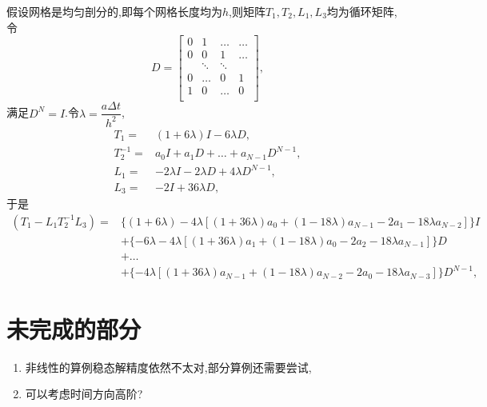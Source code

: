 \documentclass[a4paper, 11pt]{ctexart}
\numberwithin{equation}{section}
\numberwithin{figure}{section}
\begin{document}
假设网格是均匀剖分的,即每个网格长度均为$h$,则矩阵$T_1,T_2,L_1,L_3$均为循环矩阵,
令
\begin{equation}
  D=\begin{bmatrix}
    0 & 1 & \dots & \dots \\
    0 & 0 & 1 & \dots \\
    & \ddots & \ddots &\\
    0 & \dots & 0 & 1 \\
    1 & 0 & \dots & 0 \\
  \end{bmatrix},
\end{equation}
满足$D^N=I$.令$\lambda=\dfrac{a\Delta t}{h^2}$,
\begin{align}
  T_1=&\left(1+6\lambda\right)I-6\lambda D, \\
  T_2^{-1}=&a_0I+a_1D+\dots+a_{N-1}D^{N-1}, \\
  L_1=&-2\lambda I-2\lambda D+4\lambda D^{N-1}, \\
  L_3=&-2I+36\lambda D,
\end{align}
于是
\begin{align}
  (T_1-L_1T_2^{-1}L_3)=
  &\{(1+6\lambda)-4\lambda[(1+36\lambda)a_0+(1-18\lambda)a_{N-1}-2a_1-18\lambda a_{N-2}]\}I \nonumber \\
  &+\{-6\lambda-4\lambda[(1+36\lambda)a_1+(1-18\lambda)a_{0}-2a_2-18\lambda a_{N-1}]\}D\nonumber  \\
  &+\dots\nonumber  \\
  &+\{-4\lambda[(1+36\lambda)a_{N-1}+(1-18\lambda)a_{N-2}-2a_0-18\lambda a_{N-3}]\}D^{N-1} \nonumber,
\end{align}


\section{未完成的部分}
\begin{enumerate}
  \item 非线性的算例稳态解精度依然不太对,部分算例还需要尝试,
  \item 可以考虑时间方向高阶?
\end{enumerate}
\end{document}
